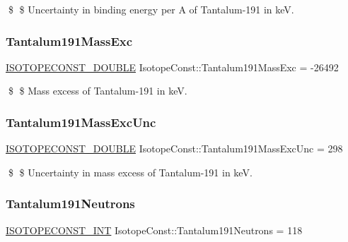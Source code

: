 \$ \$ Uncertainty in binding energy per A of Tantalum-\/191 in keV. \mbox{\label{group___isotope_const-_tantalum-_ta191_ga09196e9acaa56ca747667e6d9fa3a8e1}} 
\subsubsection{\texorpdfstring{Tantalum191\+Mass\+Exc}{Tantalum191MassExc}}
{\footnotesize\ttfamily \mbox{\hyperlink{group___isotope_const-_macros_ga8f45a7272ce02c0b4c65c44636ed719a}{I\+S\+O\+T\+O\+P\+E\+C\+O\+N\+S\+T\+\_\+\+D\+O\+U\+B\+LE}} Isotope\+Const\+::\+Tantalum191\+Mass\+Exc = -\/26492}

\$ \$ Mass excess of Tantalum-\/191 in keV. \mbox{\label{group___isotope_const-_tantalum-_ta191_gaec35efc44b9e1b9efc54e086a07cd273}} 
\subsubsection{\texorpdfstring{Tantalum191\+Mass\+Exc\+Unc}{Tantalum191MassExcUnc}}
{\footnotesize\ttfamily \mbox{\hyperlink{group___isotope_const-_macros_ga8f45a7272ce02c0b4c65c44636ed719a}{I\+S\+O\+T\+O\+P\+E\+C\+O\+N\+S\+T\+\_\+\+D\+O\+U\+B\+LE}} Isotope\+Const\+::\+Tantalum191\+Mass\+Exc\+Unc = 298}

\$ \$ Uncertainty in mass excess of Tantalum-\/191 in keV. \mbox{\label{group___isotope_const-_tantalum-_ta191_ga82e87fe40f112f99a9d0a0252831be78}} 
\subsubsection{\texorpdfstring{Tantalum191\+Neutrons}{Tantalum191Neutrons}}
{\footnotesize\ttfamily \mbox{\hyperlink{group___isotope_const-_macros_ga5f18360b3e99483a35c32d789e62621c}{I\+S\+O\+T\+O\+P\+E\+C\+O\+N\+S\+T\+\_\+\+I\+NT}} Isotope\+Const\+::\+Tantalum191\+Neutrons = 118}

